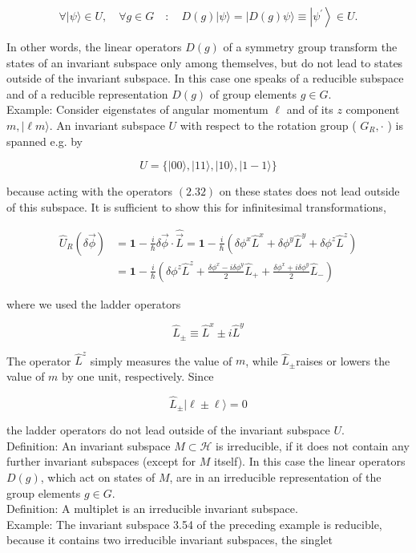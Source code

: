 \documentclass[10pt, letterpaper]{article}
\begin{document}
$$
\forall|\psi\rangle \in U, \quad \forall g \in G \quad: \quad D(g)|\psi\rangle=|D(g) \psi\rangle \equiv\left|\psi^{\prime}\right\rangle \in U .
$$

In other words, the linear operators $D(g)$ of a symmetry group transform the states of an invariant subspace only among themselves, but do not lead to states outside of the invariant subspace. In this case one speaks of a reducible subspace and of a reducible representation $D(g)$ of group elements $g \in G$.\\
Example: Consider eigenstates of angular momentum $\ell$ and of its $z$ component $m,|\ell m\rangle$. An invariant subspace $U$ with respect to the rotation group ( $G_{R}, \cdot$ ) is spanned e.g. by

$$
U=\{|00\rangle,|11\rangle,|10\rangle,|1-1\rangle\}
$$

because acting with the operators $(2.32)$ on these states does not lead outside of this subspace. It is sufficient to show this for infinitesimal transformations,

$$
\begin{aligned}
\hat{U}_{R}(\delta \vec{\phi}) & =\mathbf{1}-\frac{i}{\hbar} \delta \vec{\phi} \cdot \hat{\vec{L}}=\mathbf{1}-\frac{i}{\hbar}\left(\delta \phi^{x} \hat{L}^{x}+\delta \phi^{y} \hat{L}^{y}+\delta \phi^{z} \hat{L}^{z}\right) \\
& =\mathbf{1}-\frac{i}{\hbar}\left(\delta \phi^{z} \hat{L}^{z}+\frac{\delta \phi^{x}-i \delta \phi^{y}}{2} \hat{L}_{+}+\frac{\delta \phi^{x}+i \delta \phi^{y}}{2} \hat{L}_{-}\right)
\end{aligned}
$$

where we used the ladder operators

$$
\hat{L}_{ \pm} \equiv \hat{L}^{x} \pm i \hat{L}^{y}
$$

The operator $\hat{L}^{z}$ simply measures the value of $m$, while $\hat{L}_{ \pm}$raises or lowers the value of $m$ by one unit, respectively. Since

$$
\hat{L}_{ \pm}|\ell \pm \ell\rangle=0
$$

the ladder operators do not lead outside of the invariant subspace $U$.\\
Definition: An invariant subspace $M \subset \mathcal{H}$ is irreducible, if it does not contain any further invariant subspaces (except for $M$ itself). In this case the linear operators $D(g)$, which act on states of $M$, are in an irreducible representation of the group elements $g \in G$.\\
Definition: A multiplet is an irreducible invariant subspace.\\
Example: The invariant subspace 3.54 of the preceding example is reducible, because it contains two irreducible invariant subspaces, the singlet
\end{document}
